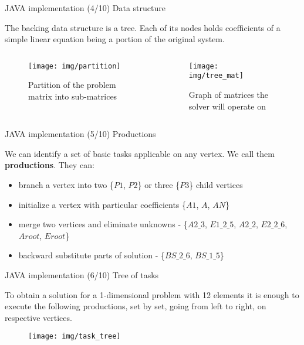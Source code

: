 \documentclass[c]{beamer}
\begin{document}
\begin{frame}{JAVA implementation (4/10) Data structure}

The backing data structure is a tree. Each of its nodes holds coefficients of a simple linear equation being a portion of the original system.

\begin{columns}
  \begin{column}{0.2\textwidth}
  \begin{figure}
      \centering
      \texttt{[image: img/partition]}
      \caption{Partition of the problem matrix into sub-matrices}
    \end{figure}
  \end{column}

  \begin{column}{0.8\textwidth}
    \begin{figure}
      \centering
      \texttt{[image: img/tree\_mat]}
      \caption{Graph of matrices the solver will operate on}
    \end{figure}
  \end{column}
\end{columns}

\end{frame}

\begin{frame}{JAVA implementation (5/10) Productions}

We can identify a set of basic tasks applicable on any vertex. We call them \textbf{productions}. They can:
\begin{itemize}
  \item branch a vertex into two \{$P1$, $P2$\} or three \{$P3$\} child vertices
  \item initialize a vertex with particular coefficients \{$A1$, $A$, $AN$\}
  \item merge two vertices and eliminate unknowns -  \{$A2\_3$, $E1\_2\_5$, $A2\_2$, $E2\_2\_6$,$Aroot$, $Eroot$\} 
  \item backward substitute parts of solution - \{$BS\_2\_6$, $BS\_1\_5$\}
\end{itemize}

\end{frame}


\begin{frame}{JAVA implementation (6/10) Tree of tasks}

To obtain a solution for a 1-dimensional problem with 12 elements it is enough to execute the following productions, set by set, going from left to right, on respective vertices.

	\begin{figure}
      \centering
      \texttt{[image: img/task\_tree]}
    \end{figure}

\end{frame}
\end{document}
